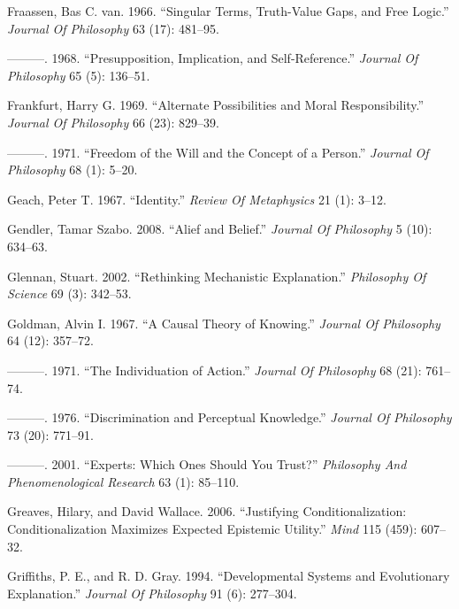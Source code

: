\documentclass[
  10pt,
  letterpaper,
  DIV=11,
  numbers=noendperiod,
  twoside]{scrartcl}
\newlength{\cslhangindent}
\newenvironment{CSLReferences}[2] %
 {\begin{list}{}{%
  \setlength{\itemindent}{0pt}
  \setlength{\leftmargin}{0pt}
  \setlength{\parsep}{0pt}
  \ifodd #1
   \setlength{\leftmargin}{\cslhangindent}
   \setlength{\itemindent}{-1\cslhangindent}
  \fi
  \setlength{\itemsep}{#2\baselineskip}}}
 {\end{list}}
\begin{document}
\begin{CSLReferences}{1}{0}
Fraassen, Bas C. van. 1966. {``Singular Terms, Truth-Value Gaps, and
Free Logic.''} \emph{Journal Of Philosophy} 63 (17): 481--95.

---------. 1968. {``Presupposition, Implication, and Self-Reference.''}
\emph{Journal Of Philosophy} 65 (5): 136--51.

Frankfurt, Harry G. 1969. {``Alternate Possibilities and Moral
Responsibility.''} \emph{Journal Of Philosophy} 66 (23): 829--39.

---------. 1971. {``Freedom of the Will and the Concept of a Person.''}
\emph{Journal Of Philosophy} 68 (1): 5--20.

Geach, Peter T. 1967. {``Identity.''} \emph{Review Of Metaphysics} 21
(1): 3--12.

Gendler, Tamar Szabo. 2008. {``Alief and Belief.''} \emph{Journal Of
Philosophy} 5 (10): 634--63.

Glennan, Stuart. 2002. {``Rethinking Mechanistic Explanation.''}
\emph{Philosophy Of Science} 69 (3): 342--53.

Goldman, Alvin I. 1967. {``A Causal Theory of Knowing.''} \emph{Journal
Of Philosophy} 64 (12): 357--72.

---------. 1971. {``The Individuation of Action.''} \emph{Journal Of
Philosophy} 68 (21): 761--74.

---------. 1976. {``Discrimination and Perceptual Knowledge.''}
\emph{Journal Of Philosophy} 73 (20): 771--91.

---------. 2001. {``Experts: Which Ones Should You Trust?''}
\emph{Philosophy And Phenomenological Research} 63 (1): 85--110.

Greaves, Hilary, and David Wallace. 2006. {``Justifying
Conditionalization: Conditionalization Maximizes Expected Epistemic
Utility.''} \emph{Mind} 115 (459): 607--32.

Griffiths, P. E., and R. D. Gray. 1994. {``Developmental Systems and
Evolutionary Explanation.''} \emph{Journal Of Philosophy} 91 (6):
277--304.


\end{CSLReferences}
\end{document}
